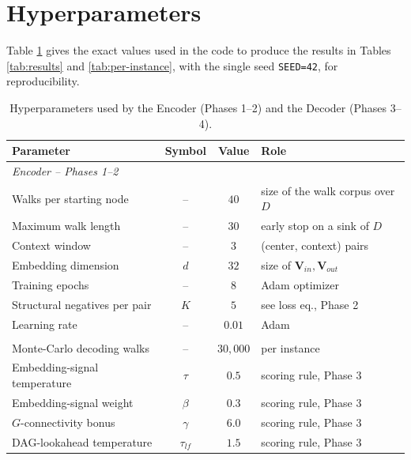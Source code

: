 \documentclass{llncs}
\begin{document}
\appendix
\section{Hyperparameters}
\label{sec:hyperparams}

Table \ref{tab:hyperparams} gives the exact values used in the code to produce the results in Tables \ref{tab:results} and \ref{tab:per-instance}, with the single seed \texttt{SEED=42}, for reproducibility.

\begin{table}[htbp]
\centering
\caption{Hyperparameters used by the Encoder (Phases 1--2) and the Decoder (Phases 3--4).}
\label{tab:hyperparams}
\begin{tabularx}{\textwidth}{Xccp{}}
\toprule
\textbf{Parameter} & \textbf{Symbol} & \textbf{Value} & \textbf{Role} \\
\midrule
\multicolumn{4}{l}{\emph{Encoder -- Phases 1--2}} \\
Walks per starting node & -- & $40$ & size of the walk corpus over $D$ \\
Maximum walk length & -- & $30$ & early stop on a sink of $D$ \\
Context window & -- & $3$ & (center, context) pairs \\
Embedding dimension & $d$ & $32$ & size of $\mathbf{V}_{in}, \mathbf{V}_{out}$ \\
Training epochs & -- & $8$ & Adam optimizer \\
Structural negatives per pair & $K$ & $5$ & see loss eq., Phase 2 \\
Learning rate & -- & $0.01$ & Adam \\
\addlinespace
\multicolumn{4}{l}{\emph{Decoder -- Phases 3--4}} \\
Monte-Carlo decoding walks & -- & $30{,}000$ & per instance \\
Embedding-signal temperature & $\tau$ & $0.5$ & scoring rule, Phase 3 \\
Embedding-signal weight & $\beta$ & $0.3$ & scoring rule, Phase 3 \\
$G$-connectivity bonus & $\gamma$ & $6.0$ & scoring rule, Phase 3 \\
DAG-lookahead temperature & $\tau_{lf}$ & $1.5$ & scoring rule, Phase 3 \\
\bottomrule
\end{tabularx}
\end{table}
\end{document}
